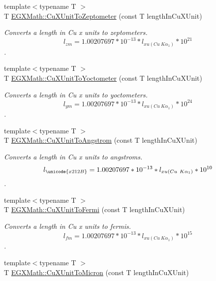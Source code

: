 \begin{DoxyCompactItemize}
{\footnotesize template$<$typename T $>$ }\\T \mbox{\hyperlink{group___e_g_x_math-_conversions-_length_conversions-_non-_s_i-_cu_x_unit-_s_i_gaa35b226ca82bd0d4389aaae81e5b385e}{E\+G\+X\+Math\+::\+Cu\+X\+Unit\+To\+Zeptometer}} (const T length\+In\+Cu\+X\+Unit)
\begin{DoxyCompactList}\small\item\em Converts a length in Cu x units to zeptometers. \[ l_{zm}=1.00207697*10^{-13} * l_{xu(Cu\ K\alpha_1)} * 10^{21} \]. \end{DoxyCompactList}\item 
{\footnotesize template$<$typename T $>$ }\\T \mbox{\hyperlink{group___e_g_x_math-_conversions-_length_conversions-_non-_s_i-_cu_x_unit-_s_i_ga1ca2e50ece8bd507137c3ce1bec24570}{E\+G\+X\+Math\+::\+Cu\+X\+Unit\+To\+Yoctometer}} (const T length\+In\+Cu\+X\+Unit)
\begin{DoxyCompactList}\small\item\em Converts a length in Cu x units to yoctometers. \[ l_{ym}=1.00207697*10^{-13} * l_{xu(Cu\ K\alpha_1)} * 10^{24} \]. \end{DoxyCompactList}\item 
{\footnotesize template$<$typename T $>$ }\\T \mbox{\hyperlink{group___e_g_x_math-_conversions-_length_conversions-_non-_s_i-_cu_x_unit-_non-_s_i_ga0ccb6fe91bb6437a1c41674613e2e395}{E\+G\+X\+Math\+::\+Cu\+X\+Unit\+To\+Angstrom}} (const T length\+In\+Cu\+X\+Unit)
\begin{DoxyCompactList}\small\item\em Converts a length in Cu x units to angstroms. \[ l_{\unicode{x212B}}=1.00207697*10^{-13} * l_{xu(Cu\ K\alpha_1)} * 10^{10} \]. \end{DoxyCompactList}\item 
{\footnotesize template$<$typename T $>$ }\\T \mbox{\hyperlink{group___e_g_x_math-_conversions-_length_conversions-_non-_s_i-_cu_x_unit-_non-_s_i_ga14c8dd2723d4482371d1ec42465f417f}{E\+G\+X\+Math\+::\+Cu\+X\+Unit\+To\+Fermi}} (const T length\+In\+Cu\+X\+Unit)
\begin{DoxyCompactList}\small\item\em Converts a length in Cu x units to fermis. \[ l_{fm}=1.00207697*10^{-13} * l_{xu(Cu\ K\alpha_1)} * 10^{15} \]. \end{DoxyCompactList}\item 
{\footnotesize template$<$typename T $>$ }\\T \mbox{\hyperlink{group___e_g_x_math-_conversions-_length_conversions-_non-_s_i-_cu_x_unit-_non-_s_i_ga382a9cae8bb23cf8d54777f5ccbff90b}{E\+G\+X\+Math\+::\+Cu\+X\+Unit\+To\+Micron}} (const T length\+In\+Cu\+X\+Unit)

\end{DoxyCompactItemize}
